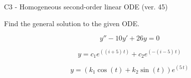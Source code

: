 \begin{exercise}
  \begin{exerciseTitle}C3 - Homogeneous second-order linear ODE (ver. 45)\end{exerciseTitle}
  \begin{exerciseStatement}
    
Find the general solution to the given ODE.

    
\[y''-10y'+26y = 0\]

  \end{exerciseStatement}
  \begin{exerciseAnswer}
    
\[y= c_{1} e^{\left(\left(i + 5\right) \, t\right)} + c_{2} e^{\left(-\left(i - 5\right) \, t\right)}\]

    
\[y= {\left(k_{1} \cos\left(t\right) + k_{2} \sin\left(t\right)\right)} e^{\left(5 \, t\right)}\]

  \end{exerciseAnswer}
\end{exercise}
